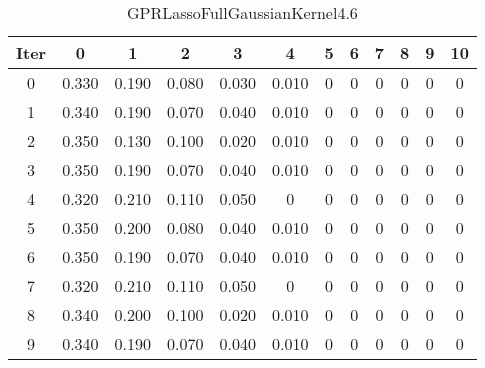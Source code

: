 \begin{table}
	\begin{center}
		\begin{tabular}{|c|c|c|c|c|c|c|c|c|c|c|c|}
			\hline
			Iter & 0 & 1 & 2 & 3 & 4 & 5 & 6 & 7 & 8 & 9 & 10 \\
			\hline
			0 & 0.330 & 0.190 & 0.080 & 0.030 & 0.010 & 0 & 0 & 0 & 0 & 0 & 0 \\
			\hline
			1 & 0.340 & 0.190 & 0.070 & 0.040 & 0.010 & 0 & 0 & 0 & 0 & 0 & 0 \\
			\hline
			2 & 0.350 & 0.130 & 0.100 & 0.020 & 0.010 & 0 & 0 & 0 & 0 & 0 & 0 \\
			\hline
			3 & 0.350 & 0.190 & 0.070 & 0.040 & 0.010 & 0 & 0 & 0 & 0 & 0 & 0 \\
			\hline
			4 & 0.320 & 0.210 & 0.110 & 0.050 & 0 & 0 & 0 & 0 & 0 & 0 & 0 \\
			\hline
			5 & 0.350 & 0.200 & 0.080 & 0.040 & 0.010 & 0 & 0 & 0 & 0 & 0 & 0 \\
			\hline
			6 & 0.350 & 0.190 & 0.070 & 0.040 & 0.010 & 0 & 0 & 0 & 0 & 0 & 0 \\
			\hline
			7 & 0.320 & 0.210 & 0.110 & 0.050 & 0 & 0 & 0 & 0 & 0 & 0 & 0 \\
			\hline
			8 & 0.340 & 0.200 & 0.100 & 0.020 & 0.010 & 0 & 0 & 0 & 0 & 0 & 0 \\
			\hline
			9 & 0.340 & 0.190 & 0.070 & 0.040 & 0.010 & 0 & 0 & 0 & 0 & 0 & 0 \\
			\hline
		\end{tabular}
	\end{center}
	\caption{GPRLassoFullGaussianKernel4.6}
\end{table}